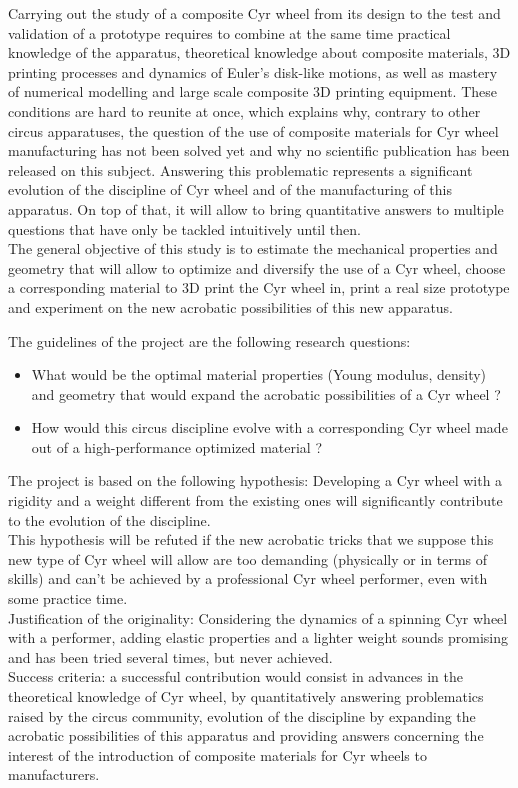 Carrying out the study of a composite Cyr wheel from its design to the test and validation of a prototype requires to combine at the same time practical knowledge of the apparatus, theoretical knowledge about composite materials, 3D printing processes and dynamics of Euler’s disk-like motions, as well as mastery of numerical modelling and large scale composite 3D printing equipment. These conditions are hard to reunite at once, which explains why, contrary to other circus apparatuses, the question of the use of composite materials for Cyr wheel manufacturing has not been solved yet and why no scientific publication has been released on this subject. Answering this problematic represents a significant evolution of the discipline of Cyr wheel and of the manufacturing of this apparatus. On top of that, it will allow to bring quantitative answers to multiple questions that have only be tackled intuitively until then.\\
The general objective of this study is to estimate the mechanical properties and geometry that will allow to optimize and diversify the use of a Cyr wheel, choose a corresponding material to 3D print the Cyr wheel in, print a real size prototype and experiment on the new acrobatic possibilities of this new apparatus.

The guidelines of the project are the following research questions:
\begin{itemize}
\item What would be the optimal material properties (Young modulus, density) and geometry that would expand the acrobatic possibilities of a Cyr wheel ? 
\item	How would this circus discipline evolve with a corresponding Cyr wheel made out of a high-performance optimized material ? 
\end{itemize}


The project is based on the following hypothesis:
\newline
Developing a Cyr wheel with a rigidity and a weight different from the existing ones will significantly contribute to the evolution of the discipline.\\
This hypothesis will be refuted if the new acrobatic tricks that we suppose this new type of Cyr wheel will allow are too demanding (physically or in terms of skills) and can’t be achieved by a professional Cyr wheel performer, even with some practice time.\\

Justification of the originality: Considering the dynamics of a spinning Cyr wheel with a performer, adding elastic properties and a lighter weight sounds promising and has been tried several times, but never achieved.\\
Success criteria: a successful contribution would consist in advances in the theoretical knowledge of Cyr wheel, by quantitatively answering problematics raised by the circus community, evolution of the discipline by expanding the acrobatic possibilities of this apparatus and providing answers concerning the interest of the introduction of composite materials for Cyr wheels to manufacturers.\\

